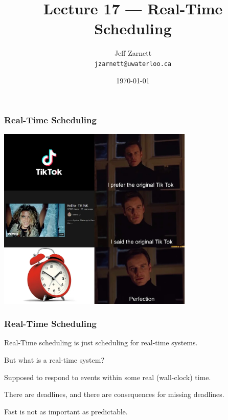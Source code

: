 

\title{Lecture 17 --- Real-Time Scheduling}

\author{Jeff Zarnett \\ \small \texttt{jzarnett@uwaterloo.ca}}
\date{\today}




\begin{frame}
  \titlepage

 \end{frame}
 
\begin{frame}
\frametitle{Real-Time Scheduling}


\begin{center}
	\includegraphics[width=0.7\textwidth]{images/tiktok.jpg}
\end{center}

\end{frame}

\begin{frame}
\frametitle{Real-Time Scheduling}

Real-Time scheduling is just scheduling for real-time systems.

But what is a real-time system?

Supposed to respond to events within some real (wall-clock) time. 

There are deadlines, and there are consequences for missing deadlines. 

Fast is not as important as predictable.

\end{frame}

